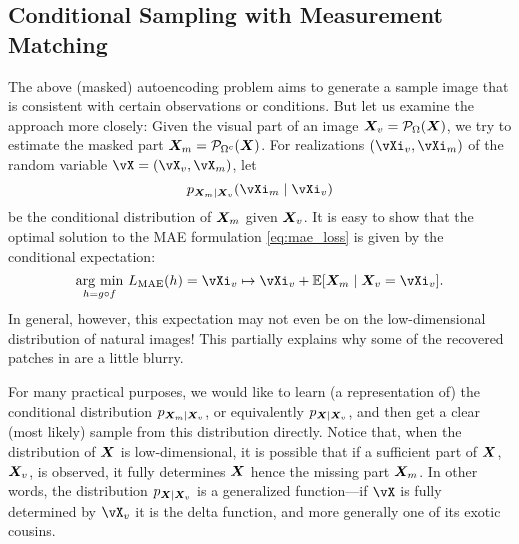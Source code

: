 \documentclass[../../book-main.tex]{subfiles}
\begin{document}




\subsection{Conditional Sampling with Measurement Matching}
\label{sec:conditioned-decoding}
The above (masked) autoencoding problem aims to generate a sample image that is consistent with certain observations or conditions. But let us examine the approach more closely: Given the
visual part of an image $\bm{X}_v = \mathcal{P}_{\Omega}(\bm{X})$, we try to
estimate the masked part $\bm{X}_m = \mathcal{P}_{\Omega^c}(\bm{X})$. For realizations
$(\vXi_v, \vXi_m)$ of the random variable $\vX=(\vX_v, \vX_m)$, let
\[p_{\X_m \mid \X_v}(\vXi_m\mid \vXi_v)\]
be the conditional distribution of $\bm{X}_m$ given
$\bm{X}_v$. It is easy to show that the optimal solution to the  MAE
formulation \eqref{eq:mae_loss} is given by the conditional expectation:
\begin{equation}
  \argmin_{h = g \circ f}\, L_{\mathrm{MAE}}(h)
  = \vXi_v \mapsto \vXi_v + \mathbb{E}[\X_m \mid \X_v=\vXi_v].
\end{equation}
In general, however, this expectation may not even be on the
low-dimensional distribution of natural images! This partially
explains why some of the recovered patches in 
are a little blurry.

For many practical purposes, we would like to learn (a representation
of) the conditional distribution $p_{\bm{X}_m \mid \bm{X}_v}$, or equivalently
$p_{\bm{X} \mid \bm{X}_v}$,
and then get a clear (most likely) sample from this distribution directly. Notice that, when the distribution of $\bm{X}$ is low-dimensional, it is possible that if a
sufficient part of $\bm{X}$, $\bm{X}_v$, is observed, it fully determines
$\bm{X}$ hence the missing part $\bm{X}_m$. In other words, the distribution
$p_{\bm{X} \mid \bm{X}_v}$ is a generalized function---if $\vX$ is fully determined by $\vX_v$ it is the delta function, and more generally one of its exotic cousins.
\end{document}
